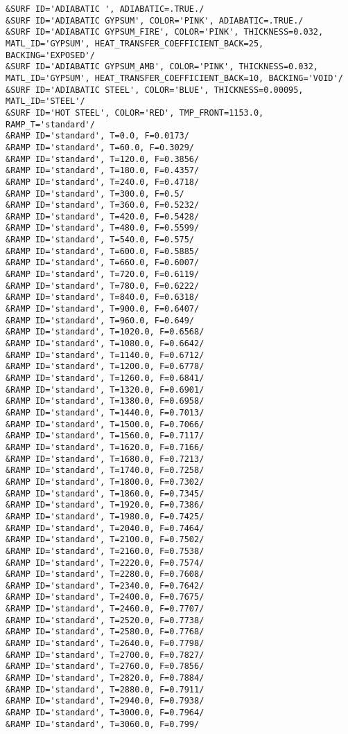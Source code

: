 \begin{lstlisting}
&SURF ID='ADIABATIC ', ADIABATIC=.TRUE./
&SURF ID='ADIABATIC GYPSUM', COLOR='PINK', ADIABATIC=.TRUE./
&SURF ID='ADIABATIC GYPSUM_FIRE', COLOR='PINK', THICKNESS=0.032, MATL_ID='GYPSUM', HEAT_TRANSFER_COEFFICIENT_BACK=25, BACKING='EXPOSED'/
&SURF ID='ADIABATIC GYPSUM_AMB', COLOR='PINK', THICKNESS=0.032, MATL_ID='GYPSUM', HEAT_TRANSFER_COEFFICIENT_BACK=10, BACKING='VOID'/
&SURF ID='ADIABATIC STEEL', COLOR='BLUE', THICKNESS=0.00095, MATL_ID='STEEL'/
&SURF ID='HOT STEEL', COLOR='RED', TMP_FRONT=1153.0, RAMP_T='standard'/
&RAMP ID='standard', T=0.0, F=0.0173/
&RAMP ID='standard', T=60.0, F=0.3029/
&RAMP ID='standard', T=120.0, F=0.3856/
&RAMP ID='standard', T=180.0, F=0.4357/
&RAMP ID='standard', T=240.0, F=0.4718/
&RAMP ID='standard', T=300.0, F=0.5/
&RAMP ID='standard', T=360.0, F=0.5232/
&RAMP ID='standard', T=420.0, F=0.5428/
&RAMP ID='standard', T=480.0, F=0.5599/
&RAMP ID='standard', T=540.0, F=0.575/
&RAMP ID='standard', T=600.0, F=0.5885/
&RAMP ID='standard', T=660.0, F=0.6007/
&RAMP ID='standard', T=720.0, F=0.6119/
&RAMP ID='standard', T=780.0, F=0.6222/
&RAMP ID='standard', T=840.0, F=0.6318/
&RAMP ID='standard', T=900.0, F=0.6407/
&RAMP ID='standard', T=960.0, F=0.649/
&RAMP ID='standard', T=1020.0, F=0.6568/
&RAMP ID='standard', T=1080.0, F=0.6642/
&RAMP ID='standard', T=1140.0, F=0.6712/
&RAMP ID='standard', T=1200.0, F=0.6778/
&RAMP ID='standard', T=1260.0, F=0.6841/
&RAMP ID='standard', T=1320.0, F=0.6901/
&RAMP ID='standard', T=1380.0, F=0.6958/
&RAMP ID='standard', T=1440.0, F=0.7013/
&RAMP ID='standard', T=1500.0, F=0.7066/
&RAMP ID='standard', T=1560.0, F=0.7117/
&RAMP ID='standard', T=1620.0, F=0.7166/
&RAMP ID='standard', T=1680.0, F=0.7213/
&RAMP ID='standard', T=1740.0, F=0.7258/
&RAMP ID='standard', T=1800.0, F=0.7302/
&RAMP ID='standard', T=1860.0, F=0.7345/
&RAMP ID='standard', T=1920.0, F=0.7386/
&RAMP ID='standard', T=1980.0, F=0.7425/
&RAMP ID='standard', T=2040.0, F=0.7464/
&RAMP ID='standard', T=2100.0, F=0.7502/
&RAMP ID='standard', T=2160.0, F=0.7538/
&RAMP ID='standard', T=2220.0, F=0.7574/
&RAMP ID='standard', T=2280.0, F=0.7608/
&RAMP ID='standard', T=2340.0, F=0.7642/
&RAMP ID='standard', T=2400.0, F=0.7675/
&RAMP ID='standard', T=2460.0, F=0.7707/
&RAMP ID='standard', T=2520.0, F=0.7738/
&RAMP ID='standard', T=2580.0, F=0.7768/
&RAMP ID='standard', T=2640.0, F=0.7798/
&RAMP ID='standard', T=2700.0, F=0.7827/
&RAMP ID='standard', T=2760.0, F=0.7856/
&RAMP ID='standard', T=2820.0, F=0.7884/
&RAMP ID='standard', T=2880.0, F=0.7911/
&RAMP ID='standard', T=2940.0, F=0.7938/
&RAMP ID='standard', T=3000.0, F=0.7964/
&RAMP ID='standard', T=3060.0, F=0.799/

\end{lstlisting}
